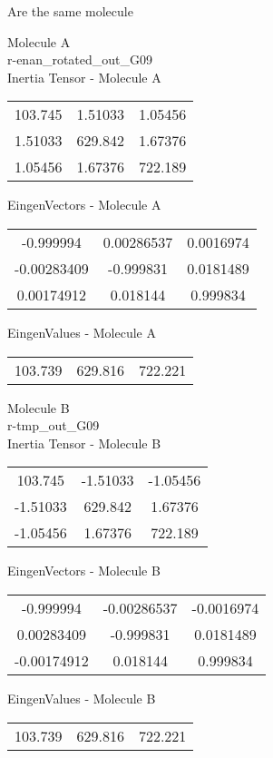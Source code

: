 \begin{center}
\vtab
\vtab
\textcolor{NavyBlue}{\Large Are the same molecule}
\end{center}
\newpage
\begin{multicols}{2}
\begin{center}
Molecule A \\ 
r-enan\_rotated\_out\_G09
\\
Inertia Tensor - Molecule A \\
\vtab
\begin{tabular}{|c c c|}
103.745	 & 	1.51033	 & 	1.05456	 \\
1.51033	 & 	629.842	 & 	1.67376	 \\
1.05456	 & 	1.67376	 & 	722.189
\end{tabular}

\vtab
 EingenVectors - Molecule A     \\
\vtab
\begin{tabular}{|c c c|}
-0.999994	 & 	0.00286537	 & 	0.0016974	 \\
-0.00283409	 & 	-0.999831	 & 	0.0181489	 \\
0.00174912	 & 	0.018144	 & 	0.999834
\end{tabular}

\vtab
 EingenValues - Molecule A     \\
\vtab
\begin{tabular}{|c c c|}
103.739	 & 	629.816	 & 	722.221
\end{tabular}
\columnbreak

Molecule B \\ 
r-tmp\_out\_G09
\\
Inertia Tensor - Molecule B \\
\vtab
\begin{tabular}{|c c c|}
103.745	 & 	-1.51033	 & 	-1.05456	 \\
-1.51033	 & 	629.842	 & 	1.67376	 \\
-1.05456	 & 	1.67376	 & 	722.189
\end{tabular}

\vtab
 EingenVectors - Molecule B     \\
\vtab
\begin{tabular}{|c c c|}
-0.999994	 & 	-0.00286537	 & 	-0.0016974	 \\
0.00283409	 & 	-0.999831	 & 	0.0181489	 \\
-0.00174912	 & 	0.018144	 & 	0.999834
\end{tabular}

\vtab
 EingenValues - Molecule B     \\
\vtab
\begin{tabular}{|c c c|}
103.739	 & 	629.816	 & 	722.221
\end{tabular}

\end{center}
\end{multicols}
